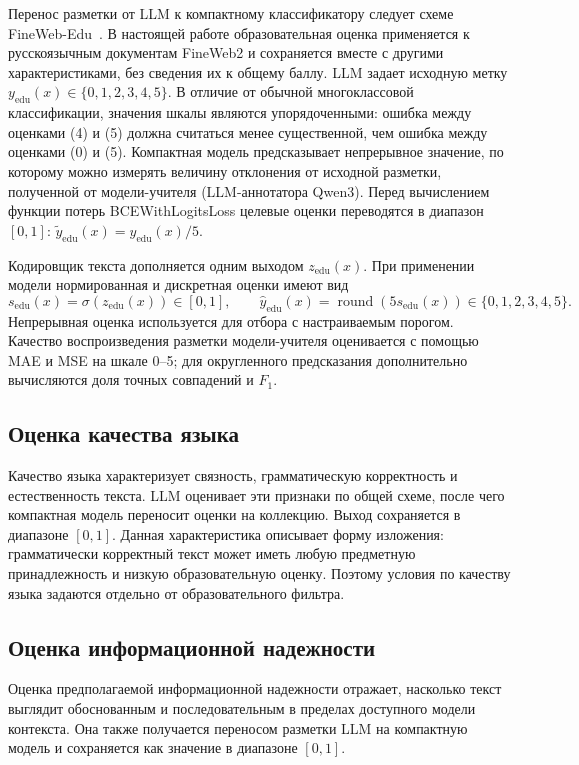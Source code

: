 \documentclass[12pt,a4paper]{article}
\begin{document}
Перенос разметки от LLM к компактному классификатору следует схеме FineWeb-Edu~\cite{fineweb}.
В настоящей работе образовательная оценка применяется к русскоязычным документам FineWeb2
и сохраняется вместе с другими характеристиками, без сведения их к общему баллу.
LLM задает исходную метку $y_{\mathrm{edu}}(x)\in\{0,1,2,3,4,5\}$.
В отличие от обычной многоклассовой классификации, значения шкалы являются упорядоченными: 
ошибка между оценками (4) и (5) должна считаться менее существенной, чем ошибка между оценками (0) и (5). 
Компактная модель предсказывает непрерывное значение,
по которому можно измерять величину отклонения от исходной разметки, полученной от модели-учителя (LLM-аннотатора Qwen3).
Перед вычислением функции потерь BCEWithLogitsLoss целевые оценки переводятся
в диапазон $[0,1]$: $\widetilde y_{\mathrm{edu}}(x)=y_{\mathrm{edu}}(x)/5$.

Кодировщик текста дополняется одним выходом $z_{\mathrm{edu}}(x)$.
При применении модели нормированная и дискретная оценки имеют вид
\begin{equation}
s_{\mathrm{edu}}(x)=\sigma(z_{\mathrm{edu}}(x))\in[0,1],
\qquad
\widehat y_{\mathrm{edu}}(x)=\operatorname{round}(5s_{\mathrm{edu}}(x))
\in\{0,1,2,3,4,5\}.
\end{equation}
Непрерывная оценка используется для отбора с настраиваемым порогом.
Качество воспроизведения разметки модели-учителя оценивается с помощью MAE и MSE на шкале 0--5;
для округленного предсказания дополнительно вычисляются доля точных совпадений и $F_1$.

\subsection{Оценка качества языка}

Качество языка характеризует связность, грамматическую корректность и естественность текста.
LLM оценивает эти признаки по общей схеме, после чего компактная модель переносит оценки на коллекцию.
Выход сохраняется в диапазоне $[0,1]$.
Данная характеристика описывает форму изложения: грамматически корректный текст
может иметь любую предметную принадлежность и низкую образовательную оценку.
Поэтому условия по качеству языка задаются отдельно от образовательного фильтра.


\subsection{Оценка информационной надежности}

Оценка предполагаемой информационной надежности отражает, насколько текст выглядит обоснованным
и последовательным в пределах доступного модели контекста.
Она также получается переносом разметки LLM на компактную модель
и сохраняется как значение в диапазоне $[0,1]$.
\end{document}
